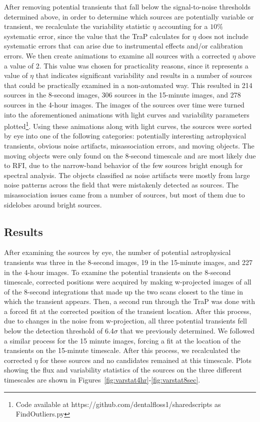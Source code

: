 \documentclass[12pt]{article}
\begin{document}
After removing potential transients that fall below the signal-to-noise thresholds determined above, in order to determine which sources are potentially variable or transient, we recalculate the variability statistic $\eta$ accounting for a $10\%$ systematic error, since the value that the TraP calculates for $\eta$ does not include systematic errors that can arise due to instrumental effects and/or calibration errors. We then create animations to examine all sources with a corrected $\eta$ above a value of 2. This value was chosen for practicality reasons, since it represents a value of $\eta$ that indicates significant variability and results in a number of sources that could be practically examined in a non-automated way. This resulted in 214 sources in the 8-second images, 306 sources in the 15-minute images, and 278 sources in the 4-hour images. The images of the sources over time were turned into the aforementioned animations with light curves and variability parameters plotted\footnote{Code available at https://github.com/dentalfloss1/sharedscripts as FindOutliers.py}. Using these animations along with light curves, the sources were sorted by eye into one of the following categories: potentially interesting astrophysical transients, obvious noise artifacts, misassociation errors, and moving objects. The moving objects were only found on the 8-second timescale and are most likely due to RFI, due to the narrow-band behavior of the few sources bright enough for spectral analysis. The objects classified as noise artifacts were mostly from large noise patterns across the field that were mistakenly detected as sources. The misassociation issues came from a number of sources, but most of them due to sidelobes around bright sources. 


\subsection{Results}
\label{sec:results2}
After examining the sources by eye, the number of potential astrophysical transients was three in the 8-second images, 19 in the 15-minute images, and 227 in the 4-hour images. To examine the potential transients on the 8-second timescale, corrected positions were acquired by making w-projected images of all of the 8-second integrations that made up the two scans closest to the time in which the transient appears. Then, a second run through the TraP was done with a forced fit at the corrected position of the transient location. After this process, due to changes in the noise from w-projection, all three potential transients fell below the detection threshold of 6.4$\sigma$ that we previously determined. We followed a similar process for the 15 minute images, forcing a fit at the location of the transients on the 15-minute timescale. After this process, we recalculated the corrected $\eta$ for these sources and no candidates remained at this timescale. Plots showing the flux and variability statistics of the sources on the three different timescales are shown in Figures~\ref{fig:varstat4hr}-\ref{fig:varstat8sec}.
\end{document}

